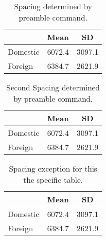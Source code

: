 \documentclass{article}
\begin{document}
    \begin{table}[htbp]\centering
           \caption{Spacing determined by preamble command.}
        \begin{tabular}{l*{1}{cc}}
            \hline
            &        Mean&          SD\\
            \hline
            Domestic    &      6072.4&      3097.1\\

            Foreign     &      6384.7&      2621.9\\
            \hline

        \end{tabular}
    \end{table}

    \begin{table}[htbp]\centering
          \caption{Second Spacing determined by preamble command.}
        \begin{tabular}{l*{1}{cc}}
            \hline
            &        Mean&          SD\\
            \hline
            Domestic    &      6072.4&      3097.1\\

            Foreign     &      6384.7&      2621.9\\
            \hline

        \end{tabular}
    \end{table}

    \begin{table}[htbp]\centering
            \setlength\extrarowheight{-5pt}
             \caption{Spacing exception for this the specific table.}
        \begin{tabular}{l*{1}{cc}}
            \hline
            &        Mean&          SD\\
            \hline
            Domestic    &      6072.4&      3097.1\\

            Foreign     &      6384.7&      2621.9\\
            \hline

        \end{tabular}
    \end{table}
\end{document}
